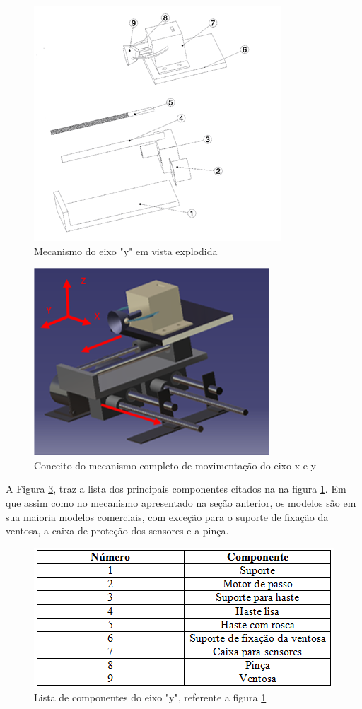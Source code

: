 \begin{figure}[H]
		\centering
			\includegraphics[scale=1.0]{figuras/eixoy.png}
		\caption{Mecanismo do eixo "y" em vista explodida}
		\label{eixoy}
\end{figure}

\begin{figure}[H]
		\centering
			\includegraphics[scale=1.0]{figuras/eixoy2.png}
		\caption{Conceito do mecanismo completo de movimentação do eixo x e y}
		\label{eixoy2}
\end{figure}

A Figura \ref{eixoy3}, traz a lista dos principais componentes citados na na figura \ref{eixoy}. Em que assim como no mecanismo apresentado na seção anterior, os modelos são em sua maioria modelos comerciais, com exceção para o suporte de fixação da ventosa, a caixa de proteção dos sensores e a pinça.

\begin{figure}[H]
		\centering
			\includegraphics[scale=1.0]{figuras/eixoy3.png}
		\caption{Lista de componentes do eixo "y", referente a figura \ref{eixoy}}
		\label{eixoy3}
\end{figure}

